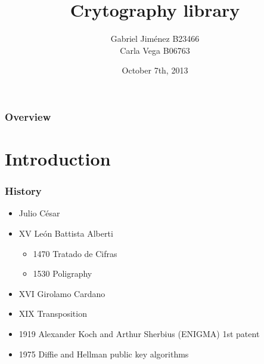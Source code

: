 \documentclass{beamer}
\title[GEYKE93]{Crytography library} %
\author{Gabriel Jiménez B23466 \\ Carla Vega B06763} %
\institute[UCR] %
{
University of Costa Rica \\ %
\medskip
\textit{}
}
\date{October 7th, 2013} %
\begin{document}
\begin{frame}
\titlepage {} %
\end{frame}

\begin{frame}
\frametitle{Overview} %
\tableofcontents %
\end{frame}


\section{Introduction}
\begin{frame}
\frametitle{History}
\begin{itemize}
\item Julio César
\item XV León Battista Alberti 
\begin{itemize}
\item 1470 Tratado de Cifras
\item 1530 Poligraphy
\end{itemize}
\item XVI Girolamo Cardano
\item XIX Transposition
\item 1919 Alexander Koch and Arthur Sherbius (ENIGMA) 1st patent
\item 1975 Diffie and Hellman public key algorithms
\end{itemize}
\end{frame}
\end{document}
